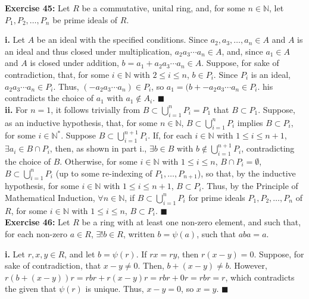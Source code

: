 \documentclass{article}%
\begin{document}
\textbf{Exercise 45:} Let $R$ be a commutative, unital ring, and, for some
$n \in \mathbb{N}$, let $P_1, P_2, \ldots, P_n$ be prime ideals of $R$.

\textbf{i.} Let $A$ be an ideal with the specified conditions. Since $a_2,
a_3, \ldots, a_n \in A$ and $A$ is an ideal and thus closed under
multiplication, $a_2a_3 \cdots a_n \in A$, and, since $a_1 \in A$ and $A$ is
closed under addition, $b = a_1 + a_2a_3 \cdots a_n \in A$. Suppose, for sake
of contradiction, that, for some $i \in \mathbb{N}$ with $2 \leq i \leq n$,
$b \in P_i$. Since $P_i$ is an ideal, $a_2a_3 \cdots a_n \in P_i$. Thus,
$(-a_2a_3 \cdots a_n) \in P_i$, so $a_1 = (b + -a_2a_3 \cdots a_n \in P_i$.
his contradicts the choice of $a_1$ with $a_1 \not \in A_i$.
\qquad $\blacksquare$ \\

\textbf{ii.} For $n = 1$, it follows trivially from $B \subset
\bigcup_{i = 1}^n P_i = P_1$ that $B \subset P_1$. Suppose, as an inductive
hypothesis, that, for some $n \in \mathbb{N}$,
$B \subset \bigcup_{i = 1}^n P_i$ implies $B \subset P_i$, for some
$i \in \mathbb{N}^*$. Suppose $B \subset \bigcup_{i = 1}^{n + 1} P_i$.
If, for
each $i \in \mathbb{N}$ with $1 \leq i \leq n + 1$, $\exists a_i \in B
\cap P_i$, then, as shown in part i., $\exists b \in B$ with
$b \not \in \bigcup_{i = 1}^{n + 1} P_i$, contradicting the choice of $B$.
Otherwise, for
some $i \in \mathbb{N}$ with $1 \leq i \leq n$, $B \cap P_i = \emptyset$,
$B \subset \bigcup_{i = 1}^n P_i$ (up to some re-indexing of
$P_1, \ldots, P_{n +1}$), so that, by the inductive hypothesis, for some
$i \in \mathbb{N}$ with $1 \leq i \leq n + 1$, $B \subset P_i$.
Thus, by the Principle of Mathematical Induction, $\forall n \in \mathbb{N}$,
if $B \subset \bigcup_{i = 1}^n P_i$ for prime ideals $P_1, P_2, \ldots, P_n$
of $R$, for some $i \in \mathbb{N}$ with $1 \leq i \leq n$, $B \subset P_i$.
\qquad $\blacksquare$ \\

\textbf{Exercise 46:} Let $R$ be a ring with at least one non-zero element,
and such that, for each non-zero $a \in R$, $\exists ! b \in R$, written
$b = \psi(a)$, such that $aba = a$.

\textbf{i.} Let $r, x, y \in R$, and let $b = \psi(r)$. If $rx = ry$, then
$r(x - y) = 0$. Suppose, for sake of contradiction, that $x - y \neq 0$.
Then, $b + (x - y) \neq b$. However, $r(b + (x - y))r = rbr + r(x - y)r
 = rbr + 0r = rbr = r$, which contradicts the given that $\psi(r)$ is unique.
Thus, $x - y = 0$, so $x = y$. \qquad $\blacksquare$ \\
\end{document}
